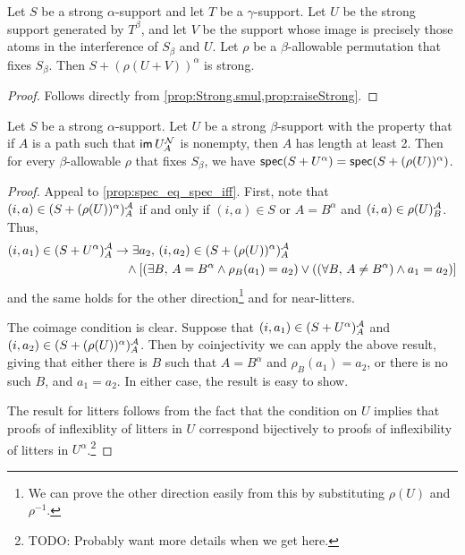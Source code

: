 \begin{proposition}
  \label{prop:raiseRaise_strong}
  Let \( S \) be a strong \( \alpha \)-support and let \( T \) be a \( \gamma \)-support.
  Let \( U \) be the strong support generated by \( T^\beta \), and let \( V \) be the support whose image is precisely those atoms in the interference of \( S_\beta \) and \( U \).
  Let \( \rho \) be a \( \beta \)-allowable permutation that fixes \( S_\beta \).
  Then \( S + (\rho(U + V))^\alpha \) is strong.
\end{proposition}
\begin{proof}
  Follows directly from \cref{prop:Strong.smul,prop:raiseStrong}.
\end{proof}
\begin{proposition}
  \label{prop:combineStrong}
  Let \( S \) be a strong \( \alpha \)-support.
  Let \( U \) be a strong \( \beta \)-support with the property that if \( A \) is a path such that \( \operatorname{\mathsf{im}} U_A^{\mathcal N} \) is nonempty, then \( A \) has length at least 2.
  Then for every \( \beta \)-allowable \( \rho \) that fixes \( S_\beta \), we have \( \operatorname{\mathsf{spec}}(S + U^\alpha) = \operatorname{\mathsf{spec}}(S + (\rho(U))^\alpha) \).
\end{proposition}
\begin{proof}
  Appeal to \cref{prop:spec_eq_spec_iff}.
  First, note that \( (i, a) \in (S + (\rho(U))^\alpha)_A^{\mathcal A} \) if and only if \( (i, a) \in S \) or \( A = B^\alpha \) and \( (i, a) \in \rho(U)_B^{\mathcal A} \).
  Thus,
  \begin{align*}
    (i, a_1) \in (S + U^\alpha)_A^{\mathcal A} &\to \exists a_2,\, (i, a_2) \in (S + (\rho(U))^\alpha)_A^{\mathcal A} \\
    &\quad\wedge [(\exists B,\, A = B^\alpha \wedge \rho_B(a_1) = a_2) \vee ((\forall B,\, A \neq B^\alpha) \wedge a_1 = a_2)]
  \end{align*}
  and the same holds for the other direction\footnote{We can prove the other direction easily from this by substituting \( \rho(U) \) and \( \rho^{-1} \).} and for near-litters.

  The coimage condition is clear.
  Suppose that \( (i, a_1) \in (S + U^\alpha)_A^{\mathcal A} \) and \( (i, a_2) \in (S + (\rho(U))^\alpha)_A^{\mathcal A} \).
  Then by coinjectivity we can apply the above result, giving that either there is \( B \) such that \( A = B^\alpha \) and \( \rho_B(a_1) = a_2 \), or there is no such \( B \), and \( a_1 = a_2 \).
  In either case, the result is easy to show.

  The result for litters follows from the fact that the condition on \( U \) implies that proofs of inflexiblity of litters in \( U \) correspond bijectively to proofs of inflexibility of litters in \( U^\alpha \).\footnote{TODO: Probably want more details when we get here.}
\end{proof}
